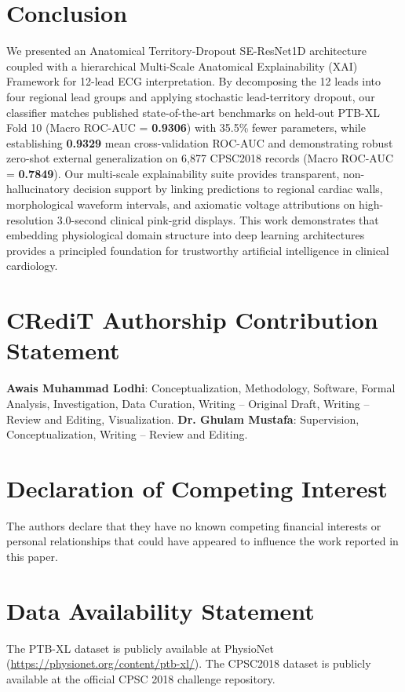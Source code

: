 \documentclass[5p,twocolumn,10pt]{elsarticle}
\begin{document}
\section{Conclusion}
\label{sec:conclusion}
We presented an Anatomical Territory-Dropout SE-ResNet1D architecture coupled with a hierarchical Multi-Scale Anatomical Explainability (XAI) Framework for 12-lead ECG interpretation. By decomposing the 12 leads into four regional lead groups and applying stochastic lead-territory dropout, our classifier matches published state-of-the-art benchmarks on held-out PTB-XL Fold 10 (Macro ROC-AUC = \textbf{0.9306}) with 35.5\% fewer parameters, while establishing \textbf{0.9329} mean cross-validation ROC-AUC and demonstrating robust zero-shot external generalization on 6,877 CPSC2018 records (Macro ROC-AUC = \textbf{0.7849}). Our multi-scale explainability suite provides transparent, non-hallucinatory decision support by linking predictions to regional cardiac walls, morphological waveform intervals, and axiomatic voltage attributions on high-resolution 3.0-second clinical pink-grid displays. This work demonstrates that embedding physiological domain structure into deep learning architectures provides a principled foundation for trustworthy artificial intelligence in clinical cardiology.

\section*{CRediT Authorship Contribution Statement}
\textbf{Awais Muhammad Lodhi}: Conceptualization, Methodology, Software, Formal Analysis, Investigation, Data Curation, Writing -- Original Draft, Writing -- Review and Editing, Visualization.
\textbf{Dr. Ghulam Mustafa}: Supervision, Conceptualization, Writing -- Review and Editing.

\section*{Declaration of Competing Interest}
The authors declare that they have no known competing financial interests or personal relationships that could have appeared to influence the work reported in this paper.

\section*{Data Availability Statement}
The PTB-XL dataset is publicly available at PhysioNet (\url{https://physionet.org/content/ptb-xl/}). The CPSC2018 dataset is publicly available at the official CPSC 2018 challenge repository.

\clearpage


\end{document}
